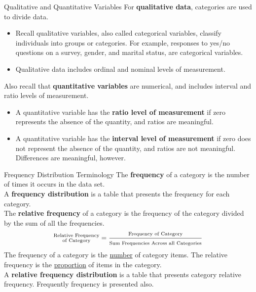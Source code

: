 \documentclass[pdf]{beamer}
\newcommand{\empr}[1]{{\color{franklinblue}\textbf{#1}}}
\theoremstyle{remark}
\theoremstyle{definition}
\begin{document}
\begin{frame}[t]{Qualitative and Quantitative Variables}
For \empr{qualitative data}, categories are used to divide data. \\
\vspace{0.0ex}
\small
\begin{itemize}
\item Recall qualitative variables, also called categorical variables, classify individuals into groups or categories. For example, responses to yes/no questions on a survey, gender, and marital status, are categorical variables.
\item  Qualitative data includes ordinal and nominal levels of measurement. \\
\end{itemize}
\normalsize
\vspace{-1.0ex}
Also recall that \empr{quantitative variables} are numerical, and includes interval and ratio levels of measurement. \\ 
\small
\begin{itemize}
\item A quantitative variable has the \empr{ratio level of measurement} if zero represents the absence of the quantity, and ratios are meaningful. 
\item A quantitative variable has the \empr{interval level of measurement} if zero does not represent the absence of the quantity, and ratios are not meaningful. Differences are meaningful, however.
\end{itemize}
\end{frame}

\begin{frame}[t]{Frequency Distribution Terminology}
The \empr{frequency} of a category is the number of times it occurs in the data set. \\
\vspace{1.5ex}
A \empr{frequency distribution} is a table that presents the frequency for each category. \\
\vspace{1.5ex}
The \empr{relative frequency} of a category is the frequency of the category divided by the sum of all the frequencies.
\begin{equation}
\substack{\text{Relative Frequency}\\\text{of Category}}= \frac{\scriptsize\text{Frequency of Category}}{\scriptsize\text{Sum Frequencies Across all Categories}}
\end{equation}
The frequency of a category is the \underline{number} of category items. The relative frequency is the \underline{proportion} of items in the category. \\
\vspace{1.5ex}
A \empr{relative frequency distribution} is a table that presents category relative frequency. Frequently frequency is presented also. \\
\end{frame}
\end{document}
